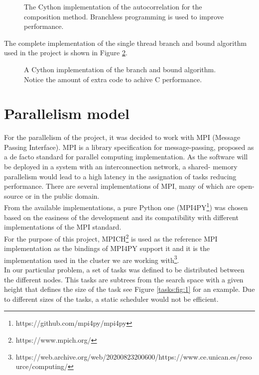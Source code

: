       \begin{figure}[ht!]
        \caption{The Cython implementation of the autocorrelation for the composition method.  Branchless programming is used to improve performance.}
        \label{composite_auto:fig:1}
      \end{figure}

  The complete implementation of the single thread branch and bound algorithm used
  in the project is shown in Figure \ref{composite_auto:fig:2}.

  \begin{figure}[ht!]
    \caption{A Cython implementation of the branch and bound algorithm. Notice
    the amount of extra code to achive C performance.}
    \label{composite_auto:fig:2}
  \end{figure}


  \section{Parallelism model}

  For the parallelism of the project, it was decided to work with MPI (Message
  Passing Interface).  MPI is a library specification for message-passing, proposed
  as a de facto standard for parallel computing implementation. As the software
  will be deployed in a system with an interconnection network, a shared-
  memory parallelism would lead to a high latency in the assignation of tasks
  reducing performance. There are several implementations of MPI, many of which are
  open-source or in the public domain.\\

 From the available implementations, a pure
 Python one (MPI4PY\footnote{https://github.com/mpi4py/mpi4py}) was chosen based on
 the easiness of the development and its compatibility with different
 implementations of the MPI standard.\\

 For the purpose of this project, MPICH\footnote{https://www.mpich.org/} is used as
 the reference MPI implementation as the bindings of MPI4PY support it and it is the
 implementation used in the cluster we are working with\footnote{https://web.archive.org/web/20200823200600/https://www.ce.unican.es/resource/computing/}.\\

  In our particular problem, a set of tasks was defined to be
  distributed between the different nodes. This tasks are subtrees from the
  search space with a given height that defines the size of the task  see Figure
  \ref{tasks:fig:1} for an example. Due to different sizes of the tasks,  a static
  scheduler would not be efficient.\\


